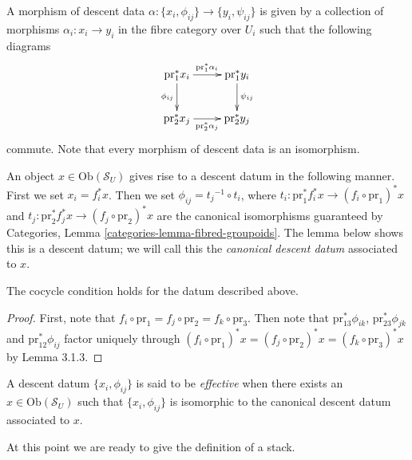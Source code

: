 \noindent
A morphism of descent data
$\alpha : \{x_i, \phi_{ij}\} \rightarrow \{y_i, \psi_{ij}\}$ is given by a
collection of morphisms $\alpha_i : x_i \to y_i$ in the fibre category
over $U_i$ such that the following diagrams
$$
\xymatrix{
\text{pr}_1^\ast x_i
	\ar[r]^{\text{pr}_1^\ast \alpha_i}
	\ar[d]_{\phi_{ij}}
&
\text{pr}_1^\ast y_i
	\ar[d]^{\psi_{ij}}
\\
\text{pr}_2^\ast x_j
	\ar[r]_{\text{pr}_2^\ast \alpha_j}
&
\text{pr}_2^\ast y_j
}
$$
commute. Note that every morphism of descent data is an isomorphism.

\medskip\noindent
An object $x \in \text{Ob}(\mathcal{S}_U)$ gives rise to a descent
datum in the following manner. First we set $x_i = f_i^\ast x$.
Then we set $\phi_{ij} = {t_{j}}^{-1} \circ t_{i}$, where
$t_{i}: \text{pr}_1^\ast f_i^\ast x \to (f_i \circ \text{pr}_1)^\ast x$
and $t_{j}: \text{pr}_2^\ast f_j^\ast x \to (f_j \circ \text{pr}_2)^\ast x$
are the canonical isomorphisms guaranteed by Categories,
Lemma \ref{categories-lemma-fibred-groupoids}.
The lemma below shows this is a descent datum; we will call
this the {\it canonical descent datum} associated to $x$.

\begin{lemma}
\label{lemma-trivial-cocycle}
The cocycle condition holds for the datum described above.
\end{lemma}

\begin{proof}
First, note that $f_i \circ\text{pr}_1 = f_j \circ \text{pr}_2=
f_k\circ \text{pr}_3$. Then note that $\text{pr}_{13}^\ast \phi_{ik}$,
$\text{pr}_{23}^\ast \phi_{jk}$ and $\text{pr}_{12}^\ast \phi_{ij}$ factor
uniquely through $(f_i\circ\text{pr}_1)^\ast x =
(f_j \circ\text{pr}_2)^\ast x = (f_k \circ\text{pr}_3)^\ast x$
by Lemma 3.1.3.
\end{proof}

\begin{definition}
\label{definition-effective-descent-datum}
A descent datum $\{x_i, \phi_{ij}\}$ is said to be {\it effective}
when there exists an $x\in \text{Ob}(\mathcal{S}_U)$
such that $\{x_i, \phi_{ij}\}$ is isomorphic to the
canonical descent datum associated to $x$.
\end{definition}

\noindent
At this point we are ready to give the definition of a
stack.

